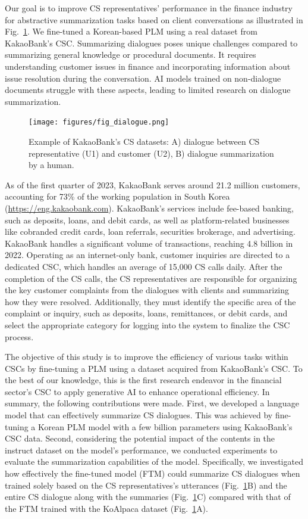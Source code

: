 \documentclass[sigconf]{acmart}
\begin{document}
Our goal is to improve CS representatives' performance in the finance industry for abstractive summarization tasks based on client conversations as illustrated in Fig.~\ref{fig_dialogue}. We fine-tuned a Korean-based PLM using a real dataset from KakaoBank's CSC. Summarizing dialogues poses unique challenges compared to summarizing general knowledge or procedural documents. It requires understanding customer issues in finance and incorporating information about issue resolution during the conversation. AI models trained on non-dialogue documents struggle with these aspects, leading to limited research on dialogue summarization.


\begin{figure}[t!]
  \centering
  \texttt{[image: figures/fig\_dialogue.png]}
  \caption{Example of KakaoBank's CS datasets: A) dialogue between CS representative (U1) and customer (U2), 
  B) dialogue summarization by a human. 
  }
\label{fig_dialogue}
\end{figure}

As of the first quarter of 2023, KakaoBank serves around 21.2 million customers, accounting for 73\% of the working population in South Korea (\url{https://eng.kakaobank.com}). KakaoBank's services include fee-based banking, such as deposits, loans, and debit cards, as well as platform-related businesses like cobranded credit cards, loan referrals, securities brokerage, and advertising. KakaoBank handles a significant volume of transactions, reaching 4.8 billion in 2022. Operating as an internet-only bank, customer inquiries are directed to a dedicated CSC, which handles an average of 15,000 CS calls daily. After the completion of the CS calls, the CS representatives are responsible for organizing the key customer complaints from the dialogues with clients and summarizing how they were resolved. Additionally, they must identify the specific area of the complaint or inquiry, such as deposits, loans, remittances, or debit cards, and select the appropriate category for logging into the system to finalize the CSC process. 


The objective of this study is to improve the efficiency of various tasks within CSCs by fine-tuning a PLM using a dataset acquired from KakaoBank's CSC. To the best of our knowledge, this is the first research endeavor in the financial sector's CSC to apply generative AI to enhance operational efficiency. In summary, the following contributions were made. First, we developed a language model that can effectively summarize CS dialogues. This was achieved by fine-tuning a Korean PLM model with a few billion parameters using KakaoBank's CSC data. Second, considering the potential impact of the contents in the instruct dataset on the model's performance, we conducted experiments to evaluate the summarization capabilities of the model. Specifically, we investigated how effectively the fine-tuned model (FTM) could summarize CS dialogues when trained solely based on the CS representatives's utterances (Fig.~\ref{fig_dialogue}B) and the entire CS dialogue along with the summaries (Fig.~\ref{fig_dialogue}C) compared with that of the FTM trained with the  KoAlpaca dataset (Fig.~\ref{fig_dialogue}A). 
\end{document}
